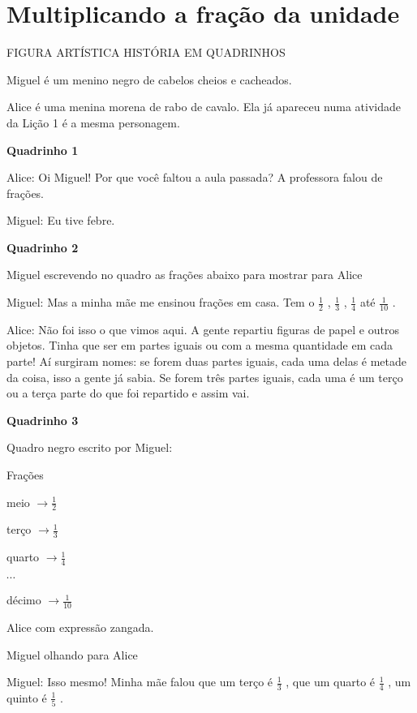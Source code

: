 
\setcounter{chapter}{1}
\setcounter{subsection}{0}
\chapter{Multiplicando a fração da unidade }


\begin{imagem*}[breakable]{}{}   FIGURA ARTÍSTICA  
  HISTÓRIA EM QUADRINHOS  
  
  Miguel é um menino negro de cabelos cheios e cacheados.  
  
  Alice é uma menina morena de rabo de cavalo. Ela já apareceu numa atividade da Lição 1 é a mesma personagem.  
  
  {\bf Quadrinho 1}  
  
  Alice: Oi Miguel! Por que você faltou a aula passada? A professora falou de frações.  
  
  Miguel: Eu tive febre.   
  
  {\bf Quadrinho 2}  
  
  Miguel escrevendo no quadro as frações abaixo para mostrar para Alice  
  
  Miguel: Mas a minha mãe me ensinou frações em casa. Tem o   $\frac{1}{2}$  ,   $\frac{1}{3}$  ,   $\frac{1}{4}$   até   $\frac{1}{10}$  .  
  
  Alice: Não foi isso o que vimos aqui. A gente repartiu figuras de papel e outros objetos. Tinha que ser em partes iguais ou com a mesma quantidade em cada parte! Aí surgiram nomes: se forem duas partes iguais, cada uma delas é metade da coisa, isso a gente já sabia. Se forem três partes iguais, cada uma é um terço ou a terça parte do que foi repartido e assim vai.  
  
  {\bf Quadrinho 3}  
  
  Quadro negro escrito por Miguel:  
  
  Frações  
  
  meio   $\longrightarrow \frac{1}{2}$     
  
  terço   $\longrightarrow \frac{1}{3}$  
  
  quarto   $\longrightarrow \frac{1}{4}$  
  
  $\cdots$  
  
  décimo   $\longrightarrow \frac{1}{10}$  
  
  Alice com expressão zangada.  
  
  Miguel olhando para Alice  
  
  Miguel: Isso mesmo! Minha mãe falou que um terço é   $\frac{1}{3}$  , que um quarto é   $\frac{1}{4}$  , um quinto é   $\frac{1}{5}$  .  
  

\end{imagem*}
